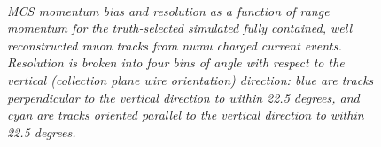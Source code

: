 \begin{figure}
\centering
\mbox{
	\quad
	}
\caption{\textit{MCS momentum bias and resolution as a function of range momentum for the truth-selected simulated fully contained, well reconstructed muon tracks from numu charged current events. Resolution is broken into four bins of angle with respect to the vertical (collection plane wire orientation) direction: blue are tracks perpendicular to the vertical direction to within 22.5 degrees, and cyan are tracks oriented parallel to the vertical direction to within 22.5 degrees.}}
\label{yangle_bias_resolution_fig}
\end{figure}























